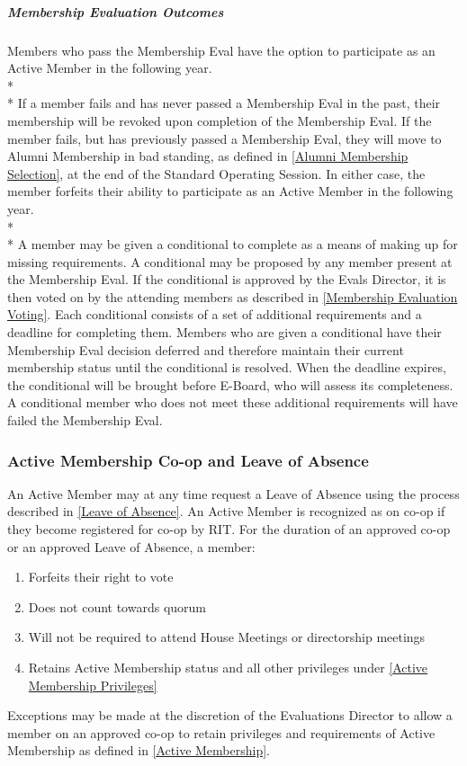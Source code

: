 \documentclass{article}
\newcommand{\asubsection}[1]{\subsubsection{#1} \label{#1}}
\newcommand{\asubsubsubsection}[1]{\subparagraph{#1} \label{#1}}
\begin{document}
\asubsubsubsection{Membership Evaluation Outcomes}
Members who pass the Membership Eval have the option to participate as an Active Member in the following year.
\\* \\*
If a member fails and has never passed a Membership Eval in the past, their membership will be revoked upon completion of the Membership Eval.
If the member fails, but has previously passed a Membership Eval, they will move to Alumni Membership in bad standing, as defined in \ref{Alumni Membership Selection}, at the end of the Standard Operating Session.
In either case, the member forfeits their ability to participate as an Active Member in the following year.
\\* \\*
A member may be given a conditional to complete as a means of making up for missing requirements.
A conditional may be proposed by any member present at the Membership Eval.
If the conditional is approved by the Evals Director, it is then voted on by the attending members as described in \ref{Membership Evaluation Voting}.
Each conditional consists of a set of additional requirements and a deadline for completing them.
Members who are given a conditional have their Membership Eval decision deferred and therefore maintain their current membership status until the conditional is resolved.
When the deadline expires, the conditional will be brought before E-Board, who will assess its completeness.
A conditional member who does not meet these additional requirements will have failed the Membership Eval.

\asubsection{Active Membership Co-op and Leave of Absence}
\renewcommand{\theenumi}{\alph{enumi}} %

An Active Member may at any time request a Leave of Absence using the process described in \ref{Leave of Absence}.
An Active Member is recognized as on co-op if they become registered for co-op by RIT.
For the duration of an approved co-op or an approved Leave of Absence, a member:
\begin{enumerate}
	\item Forfeits their right to vote
	\item Does not count towards quorum
	\item Will not be required to attend House Meetings or directorship meetings
	\item Retains Active Membership status and all other privileges under \ref{Active Membership Privileges}
\end{enumerate}
Exceptions may be made at the discretion of the Evaluations Director to allow a member on an approved co-op to retain privileges and requirements of Active Membership as defined in \ref{Active Membership}.
\end{document}
